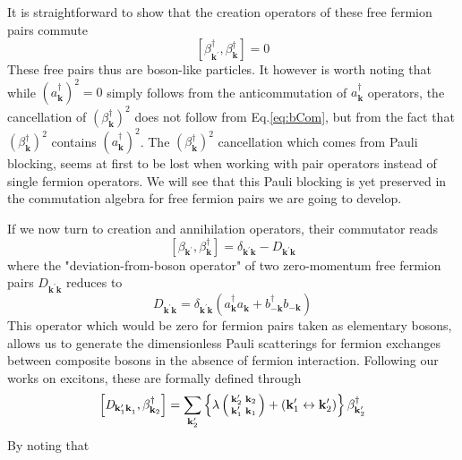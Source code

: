 \documentclass[aps,prb,superscriptaddress,showpacs,reprint,lengthcheck]{revtex4}
\newcommand{\vk}{\ensuremath{\mathbf{k}}}
\begin{document}
It is straightforward to show that the creation operators of these free fermion pairs commute 
\begin{equation}  \label{eq:bCom}
\left[\beta^{\dagger}_{\mathbf{k} ^{\prime}},\beta^{\dagger}_{\mathbf{k} }%
\right]  =0
\end{equation}
These free pairs thus are boson-like  particles.  It however is worth noting that while ${(a^{\dagger}_{\mathbf{k}})} ^2=0$
simply follows from the anticommutation of $a^{\dagger}_{\mathbf{k} }$
operators, the cancellation of ${(\beta^{\dagger}_{\mathbf{k}})} ^2$ does not follow from Eq.\eqref{eq:bCom}, but from the fact that ${(\beta^{\dagger}_{\mathbf{k}})} ^2$  contains ${(a^{\dagger}_{\mathbf{k}})} ^2$. The ${(\beta^{\dagger}_{\mathbf{k}})} ^2$  cancellation which comes from Pauli blocking, seems at first to be lost
when working with pair operators instead of  single fermion operators. We will see that this Pauli blocking is yet preserved in the commutation algebra for
free fermion pairs we are going to develop.

If we now turn to creation and annihilation operators, their commutator reads
\begin{equation}  \label{eq:betacom}
\left[\beta_{\mathbf{k} ^{\prime}},\beta^{\dagger}_{\mathbf{k} }\right] 
=\delta_{\mathbf{k} ^{\prime}\mathbf{k} }-\mathit{D} _{\mathbf{k} ^{\prime}%
\mathbf{k} }
\end{equation}
where the "deviation-from-boson operator" of two zero-momentum free fermion pairs $\mathit{D} _{\mathbf{k} ^{\prime}\mathbf{k%
} }$ reduces to 
\begin{equation}  \label{eq:D}
\mathit{D} _{\mathbf{k} ^{\prime}\mathbf{k} }=\delta_{\mathbf{k} ^{\prime}%
\mathbf{k} }\left(a^{\dagger}_{\mathbf{k}}a^{}_{\mathbf{k}
}+b^{\dagger}_{-\mathbf{k} }b^{}_{-\mathbf{k}
}\right) 
\end{equation}
This operator which would be  zero for fermion pairs  taken as
elementary bosons, allows us to generate the dimensionless Pauli scatterings for fermion
exchanges between composite bosons in the absence of fermion interaction. Following our works on excitons\cite%
{CobosonPhysicsReports}, these are formally defined through 
\begin{equation}\label{eq:dbeta}
\left[\mathit{D} _{\mathbf{k} ^{\prime}_1\mathbf{k} ^{}_1},\beta^{\dagger}_{%
\mathbf{k} _2}\right]  =\sum_{\mathbf{k} ^{\prime}_2}\left\{\lambda\left(%
\begin{smallmatrix}\vk'_2&\vk_2\\\vk'_1&\vk_1\end{smallmatrix}\right) 
+\left(\mathbf{k} ^{\prime}_1\leftrightarrow\mathbf{k} ^{\prime}_2\right)
\right\} \beta^{\dagger}_{\mathbf{k} ^{\prime}_2}
\end{equation}
By noting that
\end{document}
